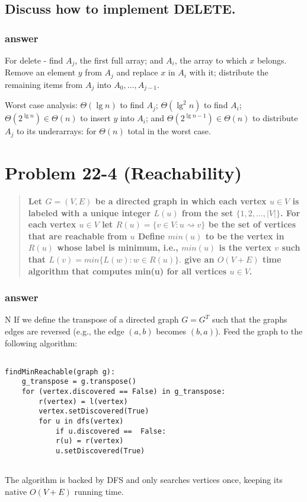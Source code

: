\documentclass[titlepage]{article}\usepackage[]{graphicx}\usepackage[]{color}
\begin{document}
  \subsection{Discuss how to implement DELETE.}
  \subsubsection{answer}

For delete - find $A_j$, the first full array; and
  $A_i$, the array to which $x$ belongs. Remove an element $y$ from
  $A_j$ and replace $x$ in $A_i$ with it; distribute the remaining
  items from $A_j$ into $A_0, \dots, A_{j-1}$.

  Worst case analysis: $\Theta(\lg n)$ to find $A_j$; $\Theta(\lg^2 n)$ to find $A_i$; $\Theta(2^{\lg n}) \in \Theta(n)$ to insert $y$
  into $A_i$; and $\Theta(2^{\lg n - 1}) \in \Theta(n)$ to distribute
  $A_j$ to its underarrays: for $\Theta(n)$ total in the worst case.

\section{Problem 22-4 (Reachability)}
\begin{quote}
\textbf{Let $G = (V,E) $ be a directed graph in which each vertex $ u \in V$
  is labeled with a unique integer $L(u) $ from the set $\{1,2,\dots,|V|\}$.
  For each vertex $u \in V$ let $R(u) = \{v \in V : u \rightsquigarrow v\}$ be the set
  of vertices that are reachable from $u$ Define $min(u)$ to be the vertex in
  $R(u)$ whose label is minimum, i.e., $min(u)$ is the vertex $v$ such that
  $L(v) = min\{L(w) : w \in R(u)\}. $ give an $O(V + E)$ time algorithm that
  computes min(u) for all vertices $u \in V$.  }
\end{quote}
\subsubsection{answer}
N
If we define the transpose of a directed graph $G = G^T$ such that the graphs
edges are reversed (e.g., the edge $(a,b)$ becomes $(b,a)$). Feed the graph to
the following algorithm:
\begin{lstlisting}

findMinReachable(graph g):
	g_transpose = g.transpose()
	for (vertex.discovered == False) in g_transpose:
		r(vertex) = l(vertex)
		vertex.setDiscovered(True)
		for u in dfs(vertex)
			if u.discovered ==  False:
			r(u) = r(vertex)
			u.setDiscovered(True)
	  
\end{lstlisting}
The algorithm is backed by DFS and only searches vertices once, keeping its
native $O(V + E) $ running time. 
\end{document}
